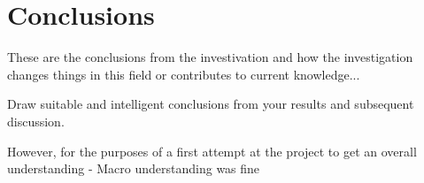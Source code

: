 \chapter{Conclusions}

These are the conclusions from the investivation and how the investigation changes things in this field or contributes to current knowledge...

Draw suitable and intelligent conclusions from your results and subsequent discussion.

However, for the purposes of a first attempt at the project to get an overall understanding - Macro understanding was fine